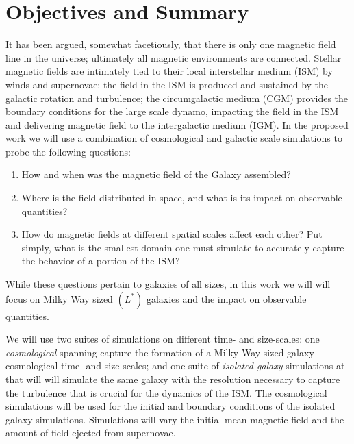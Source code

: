 \vspace{-6mm}
\section{Objectives and Summary}
\label{sec:objectives}
\vspace{-3mm}

It has been argued, somewhat facetiously, that there is only one magnetic field
line in the universe; ultimately all magnetic environments are connected.
Stellar magnetic fields are intimately tied to their local
interstellar medium (ISM) by winds and supernovae; the field in the ISM is
produced and sustained by the galactic
rotation and turbulence;  the circumgalactic medium (CGM) provides the boundary
conditions for the large scale dynamo, impacting the field in the ISM and
delivering magnetic field to the intergalactic medium (IGM).  
In the proposed
work we will use a combination of cosmological and galactic scale simulations to
probe the following questions:
\begin{enumerate}
    \item How and when was the magnetic field of the Galaxy assembled?
    \item Where is the field distributed in space, and what is its impact on
    observable quantities?  
    \item How do magnetic fields at different spatial scales affect each other?  Put
    simply, what is the smallest domain one must simulate to accurately capture the
    behavior of a portion of the ISM?
\end{enumerate}
While these questions pertain to galaxies of all sizes, in this work we will will
focus on Milky Way sized $(L^*)$ galaxies and the impact on observable quantities.

We will use two suites of simulations on different time- and size-scales:
one \emph{cosmological}
spanning  
capture the formation of a Milky Way-sized galaxy cosmological time- and size-scales; and one suite of \emph{isolated galaxy} 
simulations at 
that will will simulate the same galaxy with the resolution necessary to capture the turbulence that is
crucial for the dynamics of the ISM.  The cosmological simulations will be used
for the initial and boundary conditions of the isolated galaxy simulations.
Simulations will vary the initial mean magnetic field and the amount of field
ejected from supernovae.

